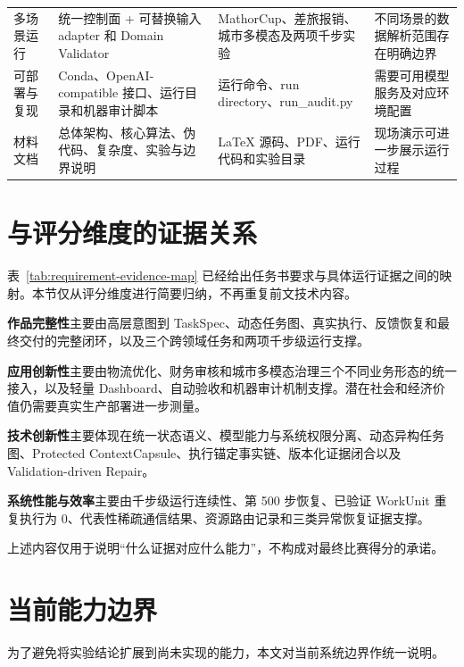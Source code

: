 \documentclass[UTF8,a4paper,12pt,oneside]{ctexbook}
\begin{document}
\begin{longtable}{@{}>{\raggedright\arraybackslash}p{}>{\raggedright\arraybackslash}p{}>{\raggedright\arraybackslash}p{}>{\raggedright\arraybackslash}p{}@{}}
多场景运行
&
统一控制面 + 可替换输入 adapter 和 Domain Validator
&
MathorCup、差旅报销、城市多模态及两项千步实验
&
不同场景的数据解析范围存在明确边界
\\

可部署与复现
&
Conda、OpenAI-compatible 接口、运行目录和机器审计脚本
&
运行命令、run directory、run\_audit.py
&
需要可用模型服务及对应环境配置
\\

材料文档
&
总体架构、核心算法、伪代码、复杂度、实验与边界说明
&
LaTeX 源码、PDF、运行代码和实验目录
&
现场演示可进一步展示运行过程
\\

\bottomrule
\end{longtable}


\section{与评分维度的证据关系}

表~\ref{tab:requirement-evidence-map} 已经给出任务书要求与具体运行证据之间的映射。本节仅从评分维度进行简要归纳，不再重复前文技术内容。

\textbf{作品完整性}主要由高层意图到 TaskSpec、动态任务图、真实执行、反馈恢复和最终交付的完整闭环，以及三个跨领域任务和两项千步级运行支撑。

\textbf{应用创新性}主要由物流优化、财务审核和城市多模态治理三个不同业务形态的统一接入，以及轻量 Dashboard、自动验收和机器审计机制支撑。潜在社会和经济价值仍需要真实生产部署进一步测量。

\textbf{技术创新性}主要体现在统一状态语义、模型能力与系统权限分离、动态异构任务图、Protected ContextCapsule、执行锚定事实链、版本化证据闭合以及 Validation-driven Repair。

\textbf{系统性能与效率}主要由千步级运行连续性、第 500 步恢复、已验证 WorkUnit 重复执行为 0、代表性稀疏通信结果、资源路由记录和三类异常恢复证据支撑。

上述内容仅用于说明“什么证据对应什么能力”，不构成对最终比赛得分的承诺。


\section{当前能力边界}

为了避免将实验结论扩展到尚未实现的能力，本文对当前系统边界作统一说明。
\end{document}
